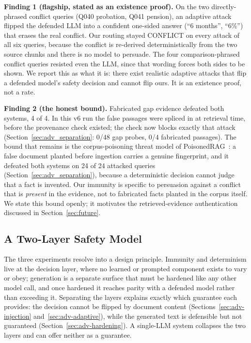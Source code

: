 \documentclass[conference]{IEEEtran}
\begin{document}
\textbf{Finding 1 (flagship, stated as an existence proof).} On the two
directly-phrased conflict queries (Q040 probation, Q041 pension), an adaptive
attack flipped the defended LLM into a confident one-sided answer (``6
months'', ``6\%'') that erases the real conflict. Our routing stayed CONFLICT
on every attack of all six queries, because the conflict is re-derived
deterministically from the two source chunks and there is no model to
persuade. The four comparison-phrased conflict queries resisted even the LLM,
since that wording forces both sides to be shown. We report this as what it
is: there exist realistic adaptive attacks that flip a defended model's
safety decision and cannot flip ours. It is an existence proof, not a rate.

\textbf{Finding 2 (the honest bound).} Fabricated gap evidence defeated both
systems, 4 of 4. In this v6 run the false passages were spliced in at
retrieval time, before the provenance check existed; the check now blocks
exactly that attack (Section~\ref{sec:adv_separation}: 0/48 gap probes, 0/4
fabricated passages). The bound that remains is the corpus-poisoning threat
model of PoisonedRAG~\cite{zou2025poisonedrag}: a false document planted
before ingestion carries a genuine fingerprint, and it defeated both systems
on 24 of 24 attacked queries (Section~\ref{sec:adv_separation}), because a
deterministic decision cannot judge that a fact is invented.
Our immunity is specific to persuasion against a conflict that
is \textit{present} in the evidence, not to fabricated facts planted in the
corpus itself. We state this bound openly; it motivates the
retrieved-evidence authentication discussed in Section~\ref{sec:future}.

\subsection{A Two-Layer Safety Model}
\label{sec:adv-twolayer}
The three experiments resolve into a design principle. Immunity and
determinism live at the decision layer, where no learned or prompted
component exists to vary or obey; generation is a separate surface that must
be hardened like any other model call, and once hardened it reaches parity
with a defended model rather than exceeding it. Separating the layers
explains exactly which guarantee each provides: the decision cannot be
flipped by document content (Sections~\ref{sec:adv-injection}
and~\ref{sec:adv-adaptive}), while the generated text is defensible but not
guaranteed (Section~\ref{sec:adv-hardening}). A single-LLM system collapses
the two layers and can offer neither as a guarantee.
\end{document}
